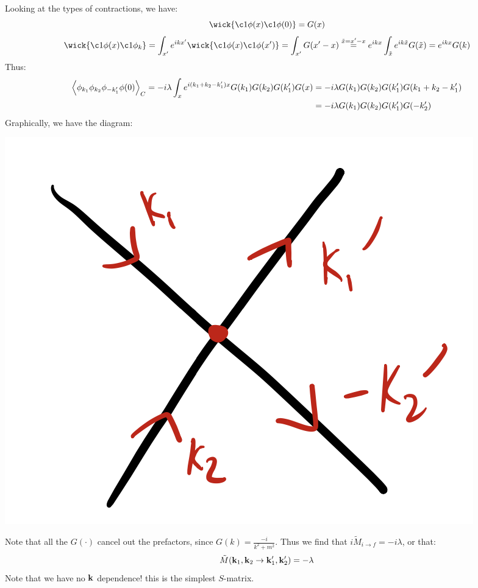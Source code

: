 Looking at the types of contractions, we have:
\begin{equation}
    \wick{\c1 \phi(x) \c1 \phi(0)} = G(x)
\end{equation}
\begin{equation}
    \wick{\c1 \phi(x) \c1 \phi_k} = \int_{x'}e^{ikx'}\wick{\c1 \phi(x) \c1 \phi(x')} = \int_{x'}G(x' - x) \stackrel{\tilde{x} = x' - x}{=} e^{ikx}\int_{\tilde{x}} e^{ik\tilde{x}}G(\tilde{x}) = e^{ikx}G(k)
\end{equation}
Thus:
\begin{equation}
    \begin{split}
        \left< \phi_{k_1}\phi_{k_2}\phi_{-k_1'}\phi(0) \right>_C = -i\lambda\int_{x}e^{i(k_1 + k_2 - k_1')x}G(k_1)G(k_2)G(k_1')G(x) &= -i\lambda G(k_1)G(k_2)G(k_1')G(k_1 + k_2 - k_1') 
        \\ &= -i\lambda G(k_1)G(k_2)G(k_1')G(-k_2')
    \end{split}
\end{equation}
Graphically, we have the diagram:

\begin{center}
    \includegraphics[scale=0.3]{Lectures/Figures/lec17-4pointvertex.png}
\end{center}

Note that all the $G(\cdot)$ cancel out the prefactors, since $G(k) = \frac{-i}{k^2 + m^2}$. Thus we find that $i\tilde{M}_{i \to f} = -i\lambda$, or that:
\begin{equation}
    \tilde{M}(\mathbf{k}_1, \mathbf{k}_2 \to \mathbf{k}_1', \mathbf{k}_2') = -\lambda
\end{equation}
Note that we have no $\mathbf{k}$ dependence! this is the simplest $S$-matrix.


